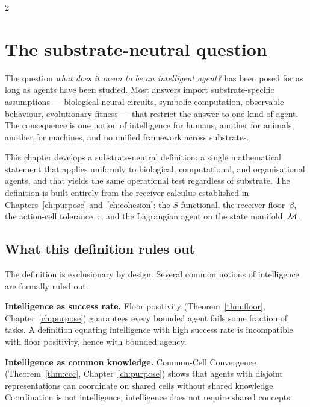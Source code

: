 \begin{multicols}{2}

\section{The substrate-neutral question}
\label{sec:ch05-intro}

The question \emph{what does it mean to be an intelligent agent?} has been posed for as
long as agents have been studied. Most answers import substrate-specific assumptions ---
biological neural circuits, symbolic computation, observable behaviour, evolutionary
fitness --- that restrict the answer to one kind of agent. The consequence is one notion
of intelligence for humans, another for animals, another for machines, and no unified
framework across substrates.

This chapter develops a substrate-neutral definition: a single mathematical statement
that applies uniformly to biological, computational, and organisational agents, and that
yields the same operational test regardless of substrate. The definition is built
entirely from the receiver calculus established in Chapters~\ref{ch:purpose}
and~\ref{ch:cohesion}: the $S$-functional, the receiver floor~$\beta$, the action-cell
tolerance~$\tau$, and the Lagrangian agent on the state manifold~$\mathcal{M}$.

\subsection{What this definition rules out}

The definition is exclusionary by design. Several common notions of intelligence are
formally ruled out.

\textbf{Intelligence as success rate.} Floor positivity (Theorem~\ref{thm:floor},
Chapter~\ref{ch:purpose}) guarantees every bounded agent fails some fraction of tasks.
A definition equating intelligence with high success rate is incompatible with floor
positivity, hence with bounded agency.

\textbf{Intelligence as common knowledge.} Common-Cell Convergence
(Theorem~\ref{thm:ccc}, Chapter~\ref{ch:purpose}) shows that agents with disjoint
representations can coordinate on shared cells without shared knowledge. Coordination is
not intelligence; intelligence does not require shared concepts.


\end{multicols}
